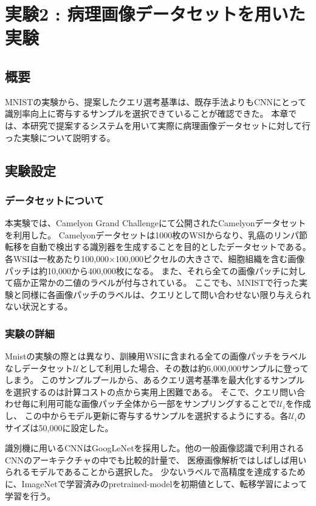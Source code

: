 \chapter{実験2 : 病理画像データセットを用いた実験}
\section{概要}
MNISTの実験から、提案したクエリ選考基準は、既存手法よりもCNNにとって識別率向上に寄与するサンプルを選択できていることが確認できた。
本章では、本研究で提案するシステムを用いて実際に病理画像データセットに対して行った実験について説明する。

\section{実験設定}
\subsection{データセットについて}
本実験では、Camelyon Grand Challenge\cite{Camelyon17}にて公開されたCamelyonデータセットを利用した。
Camelyonデータセットは1000枚のWSIからなり、乳癌のリンパ節転移を自動で検出する識別器を生成することを目的としたデータセットである。
各WSIは一枚あたり100,000×100,000ピクセルの大きさで、細胞組織を含む画像パッチは約10,000から400,000枚になる。
また、それら全ての画像パッチに対して癌か正常かの二値のラベルが付与されている。
ここでも、MNISTで行った実験と同様に各画像パッチのラベルは、クエリとして問い合わせない限り与えられない状況とする。


\subsection{実験の詳細}
Mnistの実験の際とは異なり、訓練用WSIに含まれる全ての画像パッチをラベルなしデータセット$\mathcal{U}$として利用した場合、その数は約6,000,000サンプルに登ってしまう。
このサンプルプールから、あるクエリ選考基準を最大化するサンプルを選択するのは計算コストの点から実用上困難である。
そこで、クエリ問い合わせ毎に利用可能な画像パッチ全体から一部をサンプリングすることで$\mathcal{U}_i$を作成し、
この中からモデル更新に寄与するサンプルを選択するようにする。各$\mathcal{U}_i$のサイズは50,000に設定した。

識別機に用いるCNNはGoogLeNetを採用した。他の一般画像認識で利用されるCNNのアーキテクチャの中でも比較的計量で、
医療画像解析ではしばしば用いられるモデルであることから選択した。
少ないラベルで高精度を達成するために、ImageNetで学習済みのpretrained-modelを初期値として、転移学習によって学習を行う。

